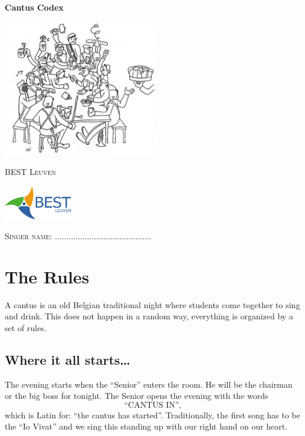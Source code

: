 \documentclass[a5paper]{article}
\begin{document}
\setcounter{secnumdepth}{1}
\setcounter{tocdepth}{3}


	\begin{titlepage}
		\centering
		{\huge\bfseries Cantus Codex\par}
		\vspace{0.5cm}
        \includegraphics[height=6cm]{frontpicture.png}
		{\scshape\LARGE BEST Leuven\par}
		\vspace{0.5cm}
		\includegraphics[height=1.5cm]{bestleuvenlogo.png}
		\vfill
		\vspace{0.5cm}
		{\scshape\LARGE Singer name: ..........................................\par}
	\end{titlepage}

	\tableofcontents

	\newpage



\section{The Rules}
\label{sec:rules}

A cantus is an old Belgian traditional night where students come together to sing and drink. This does not happen in a random way, everything is organized by a set of rules.

\subsection{Where it all starts…}
\label{sub:start}

The evening starts when the ``Senior'' enters the room. He will be the chairman or the big boss for tonight. The Senior opens the evening with the words $$\text{``CANTUS IN''},$$ which is Latin for: ``the cantus has started''. Traditionally, the first song has to be the ``Io Vivat'' and we sing this standing up with our right hand on our heart.
\end{document}
